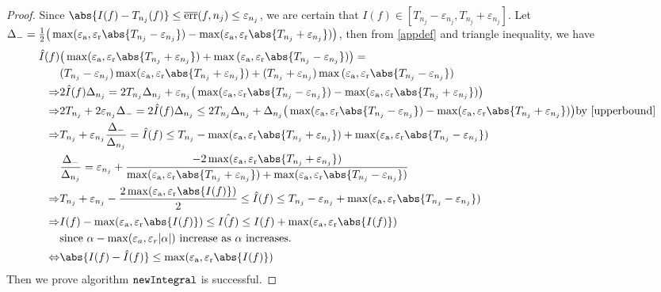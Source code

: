 \documentclass{iitthesis}
\DeclareMathOperator{\newinteg}{\texttt{\textup{newIntegral}}}
\DeclareMathOperator{\err}{err}
\newcommand{\oerr}{\overline{\err}}
\newcommand{\abstol}{\varepsilon_{\textrm{a}}}
\newcommand{\reltol}{\varepsilon_{\textrm{r}}}
\begin{document}
\begin{proof}

Since $\abs{I(f)-T_{n_j}(f)} \le \oerr(f,n_j) \le \varepsilon_{n_j}$, we are certain that $ I(f) \in [T_{n_j}-\varepsilon_{n_j}, T_{n_j}+\varepsilon_{n_j}]$. 
Let $\Delta_-=\frac{1}{2}\big(\max(\abstol, \reltol\abs{T_{n_j}-\varepsilon_{n_j}})-\max(\abstol, \reltol\abs{T_{n_j}+\varepsilon_{n_j}})\big)$, then from \eqref{appdef} and triangle inequality, we have
\begin{align*}
\hat{I}(f) &\big(\max ( \abstol,\reltol \abs{T_{n_j}+\varepsilon_{n_j}})+ \max{(\abstol, \reltol\abs{T_{n_j}-\varepsilon_{n_j}})}\big) =\\
& (T_{n_j}-\varepsilon_{n_j}) \max ( \abstol,\reltol \abs{T_{n_j}+\varepsilon_{n_j}})+(T_{n_j} + \varepsilon_{n_j} ) \max{(\abstol, \reltol\abs{T_{n_j}-\varepsilon_{n_j}})}\\
\Rightarrow & 2 \hat{I}(f) \Delta_{n_j} = 2 T_{n_j} \Delta_{n_j}+ \varepsilon_{n_j}\big( \max(\abstol, \reltol\abs{T_{n_j}-\varepsilon_{n_j}})-\max(\abstol, \reltol\abs{T_{n_j}+\varepsilon_{n_j}}) \big)\\
\Rightarrow & 2 T_{n_j}+2 \varepsilon_{n_j} \Delta_- = 2 \hat{I}(f) \Delta_{n_j} \le 2 T_{n_j} \Delta_{n_j}+\Delta_{n_j} \big( \max(\abstol, \reltol\abs{T_{n_j}-\varepsilon_{n_j}})-\max(\abstol, \reltol\abs{T_{n_j}+\varepsilon_{n_j}}) \big) \text{by \eqref{upperbound}}\\
\Rightarrow & T_{n_j}+\varepsilon_{n_j} \frac{\Delta_-}{\Delta_{n_j}} = \hat{I}(f) \le T_{n_j}-\max(\abstol, \reltol\abs{T_{n_j}+\varepsilon_{n_j}})+\max(\abstol, \reltol\abs{T_{n_j}-\varepsilon_{n_j}})\\
& \frac{\Delta_-}{\Delta_{n_j}}= \varepsilon_{n_j}+\frac{-2 \max(\abstol,\reltol \abs{T_{n_j}+\varepsilon_{n_j}})}{\max(\abstol, \reltol\abs{T_{n_j}+\varepsilon_{n_j}})+\max(\abstol, \reltol\abs{T_{n_j}-\varepsilon_{n_j}})}\\
\Rightarrow &  T_{n_j}+\varepsilon_{n_j}-\frac{2\max(\abstol,\reltol\abs{I(f)})}{2}\le \hat{I}(f) \le T_{n_j}-\varepsilon_{n_j}+\max(\abstol, \reltol\abs{T_{n_j}-\varepsilon_{n_j}})\\
\Rightarrow & I(f)-\max(\abstol,\reltol \abs{I(f)})\le\hat{I(f)} \le I(f)+ \max(\abstol,\reltol\abs{I(f)})\\
&\text{since } \alpha-\max(\varepsilon_{a},\varepsilon_{r}|\alpha|) \text{ increase as } \alpha \text{ increases.}\\
\Leftrightarrow & \abs{I(f)-\hat{I}(f)} \le \max(\abstol,\reltol \abs{I(f)})
\end{align*}
Then we prove algorithm $\newinteg$ is successful.
\end{proof}
\end{document}
